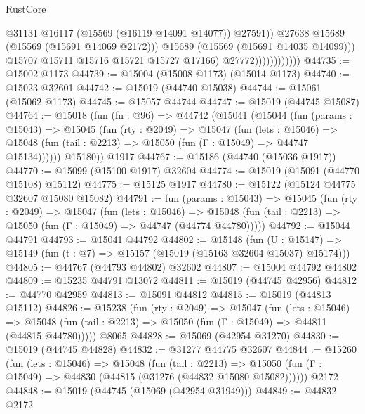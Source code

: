 \begin{lexlean}{RustCore}
\begin{coremodule}
                                      @31131
                                      @16117
                                      (@15569 (@16119 @14091 @14077))
                                      @27591))
                                  @27638
                                  @15689
                                  (@15569 (@15691 @14069 @2172)))
                                @15689
                                (@15569 (@15691 @14035 @14099)))
                              @15707
                              @15711
                              @15716
                              @15721
                              @15727
                              @17166)
                            @27772))))))))))))
@44735 := @15002 @1173
@44739 := @15004 (@15008 @1173) (@15014 @1173)
@44740 := @15023 @32601
@44742 := @15019 (@44740 @15038)
@44744 := @15061 (@15062 @1173)
@44745 := @15057 @44744
@44747 := @15019 (@44745 @15087)
@44764 := @15018
    (fun (fn : @96) =>
    @44742
      (@15041
        (@15044
          (fun (params : @15043) =>
          @15045
            (fun (rty : @2049) =>
            @15047
              (fun (lets : @15046) =>
              @15048 (fun (tail : @2213) => @15050 (fun (Γ : @15049) => @44747 @15134))))))
        @15180))
    @1917
@44767 := @15186 (@44740 (@15036 @1917))
@44770 := @15099 (@15100 @1917) @32604
@44774 := @15019 (@15091 (@44770 @15108) @15112)
@44775 := @15125 @1917
@44780 := @15122 (@15124 @44775 @32607 @15080 @15082)
@44791 := fun (params : @15043) =>
  @15045
    (fun (rty : @2049) =>
    @15047
      (fun (lets : @15046) =>
      @15048 (fun (tail : @2213) => @15050 (fun (Γ : @15049) => @44747 (@44774 @44780)))))
@44792 := @15044 @44791
@44793 := @15041 @44792
@44802 := @15148
    (fun (U : @15147) => @15149 (fun (t : @7) => @15157 (@15019 (@15163 @32604 @15037) @15174)))
@44805 := @44767 (@44793 @44802) @32602
@44807 := @15004 @44792 @44802
@44809 := @15235 @44791 @13072
@44811 := @15019 (@44745 @42956)
@44812 := @44770 @42959
@44813 := @15091 @44812
@44815 := @15019 (@44813 @15112)
@44826 := @15238
    (fun (rty : @2049) =>
    @15047
      (fun (lets : @15046) =>
      @15048 (fun (tail : @2213) => @15050 (fun (Γ : @15049) => @44811 (@44815 @44780)))))
    @8065
@44828 := @15069 (@42954 @31270)
@44830 := @15019 (@44745 @44828)
@44832 := @31277 @44775 @32607
@44844 := @15260
    (fun (lets : @15046) =>
    @15048
      (fun (tail : @2213) =>
      @15050 (fun (Γ : @15049) => @44830 (@44815 (@31276 (@44832 @15080 @15082))))))
    @2172
@44848 := @15019 (@44745 (@15069 (@42954 @31949)))
@44849 := @44832 @2172

\end{coremodule}
\end{lexlean}
